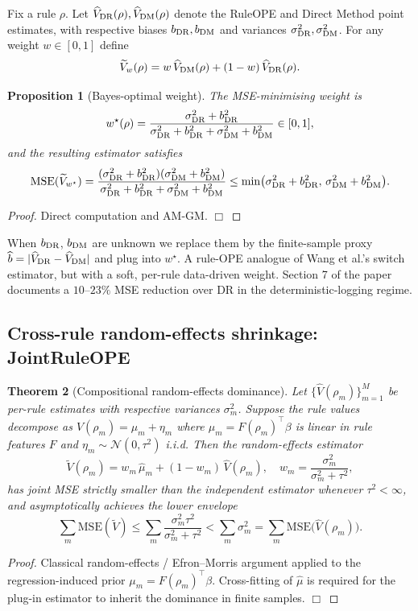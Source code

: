 \documentclass[11pt]{article}
\newtheorem{theorem}{Theorem}
\newtheorem{proposition}[theorem]{Proposition}
\begin{document}
Fix a rule $\rho$.  Let $\widehat V_{\rm DR}(\rho), \widehat V_{\rm DM}(\rho)$
denote the RuleOPE and Direct Method point estimates, with respective
biases $b_{\rm DR}, b_{\rm DM}$ and variances $\sigma_{\rm DR}^2,
\sigma_{\rm DM}^2$.  For any weight $w \in [0, 1]$ define
$$
\widetilde V_w(\rho) = w\,\widehat V_{\rm DM}(\rho) + (1 - w)\,\widehat V_{\rm DR}(\rho).
$$
\begin{proposition}[Bayes-optimal weight]\label{prop:dual-w}
The MSE-minimising weight is
$$
w^\star(\rho) = \frac{\sigma_{\rm DR}^2 + b_{\rm DR}^2}{\sigma_{\rm DR}^2 + b_{\rm DR}^2 + \sigma_{\rm DM}^2 + b_{\rm DM}^2} \in [0, 1],
$$
and the resulting estimator satisfies
$$
\mathrm{MSE}(\widetilde V_{w^\star}) = \frac{(\sigma_{\rm DR}^2 + b_{\rm DR}^2)(\sigma_{\rm DM}^2 + b_{\rm DM}^2)}{\sigma_{\rm DR}^2 + b_{\rm DR}^2 + \sigma_{\rm DM}^2 + b_{\rm DM}^2}
\le \min\bigl(\sigma_{\rm DR}^2 + b_{\rm DR}^2,\, \sigma_{\rm DM}^2 + b_{\rm DM}^2\bigr).
$$
\end{proposition}
\begin{proof}
Direct computation and AM-GM.  $\Box$
\end{proof}

When $b_{\rm DR}$, $b_{\rm DM}$ are unknown we replace them by the
finite-sample proxy $\widehat b = |\widehat V_{\rm DR} - \widehat V_{\rm DM}|$
and plug into $w^\star$.  A rule-OPE analogue of Wang et al.'s switch
estimator, but with a soft, per-rule data-driven weight.  Section 7 of
the paper documents a $10$--$23\%$ MSE reduction over DR in the
deterministic-logging regime.

\subsection{Cross-rule random-effects shrinkage: JointRuleOPE}

\begin{theorem}[Compositional random-effects dominance]\label{thm:shrink}
Let $\{\widehat V(\rho_m)\}_{m=1}^M$ be per-rule estimates with
respective variances $\sigma_m^2$.  Suppose the rule values decompose as
$V(\rho_m) = \mu_m + \eta_m$ where $\mu_m = F(\rho_m)^\top \beta$ is
linear in rule features $F$ and $\eta_m \sim \mathcal{N}(0, \tau^2)$
i.i.d.  Then the random-effects estimator
$$
\widetilde V(\rho_m) = w_m\, \widehat\mu_m + (1 - w_m)\, \widehat V(\rho_m),\quad
w_m = \frac{\sigma_m^2}{\sigma_m^2 + \tau^2},
$$
has joint MSE strictly smaller than the independent estimator
whenever $\tau^2 < \infty$, and asymptotically achieves the lower
envelope
$$
\sum_m \mathrm{MSE}(\widetilde V) \le \sum_m \frac{\sigma_m^2 \tau^2}{\sigma_m^2 + \tau^2}
< \sum_m \sigma_m^2 = \sum_m \mathrm{MSE}\bigl(\widehat V(\rho_m)\bigr).
$$
\end{theorem}
\begin{proof}
Classical random-effects / Efron--Morris argument applied to the
regression-induced prior $\mu_m = F(\rho_m)^\top \beta$.  Cross-fitting
of $\widehat\mu$ is required for the plug-in estimator to inherit the
dominance in finite samples.  $\Box$
\end{proof}
\end{document}
